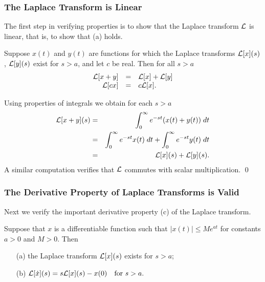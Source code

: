 \subsubsection*{The Laplace Transform is Linear}

The first step in verifying properties  is to show that the 
Laplace transform ${\cal L}$ is linear, that is, to 
show that (a) holds.
\begin{prop}  \label{prop:linLap}
Suppose $x(t)$ and $y(t)$ are functions for which the Laplace transforms
${\cal L}[x](s)$, ${\cal L}[y](s)$ exist for $s>a$, and let $c$ be real. 
Then for all $s>a$
\begin{equation}  \label{eq:linLap}
\begin{array}{rcl}
{\cal L}[x + y] &  = & {\cal L}[x] + {\cal L}[y] \\
{\cal L}[cx] & = & c{\cal L}[x].
\end{array}
\end{equation}
\end{prop}

\proof Using properties of integrals we obtain for each $s>a$
\begin{eqnarray*}
{\cal L}[x+y](s) &=& \int_0^{\infty} e^{-st} (x(t)+y(t))\; dt\\
&=& \int_0^{\infty} e^{-st} x(t)\; dt + \int_0^{\infty} e^{-st} y(t)\; dt\\
&=& {\cal L}[x](s)+ {\cal L}[y](s).
\end{eqnarray*}
A similar computation verifies that ${\cal L}$ commutes with scalar 
multiplication.  \qed

\subsubsection*{The Derivative Property of Laplace Transforms is Valid}

Next we verify the important derivative property (c) of the 
Laplace transform.  

\begin{prop}  \label{prop:derLap}
Suppose that $x$ is a differentiable function such that 
$|x(t)|\le Me^{at}$ for constants $a>0$ and $M>0$.  
Then
\begin{itemize}
\item[(a)] the Laplace transform ${\cal L}[x](s)$ exists for $s>a$; 
\item[(b)] ${\cal L}[\dot x](s) = s{\cal L}[x](s) - x(0) \quad 
\mbox{for $s>a$.}$
\end{itemize}
\end{prop}

